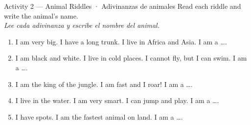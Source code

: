 \begin{activity}{Activity 2 — Animal Riddles · Adivinanzas de animales}
Read each riddle and write the animal's name. \\
\textit{Lee cada adivinanza y escribe el nombre del animal.}

\bigskip
\begin{enumerate}
  \item I am very big. I have a long trunk. I live in Africa and Asia.
        I am a \ldots \answerline[5cm].

  \item I am black and white. I live in cold places. I cannot fly,
        but I can swim. I am a \ldots \answerline[5cm].

  \item I am the king of the jungle. I am fast and I roar!
        I am a \ldots \answerline[5cm].

  \item I live in the water. I am very smart. I can jump and play.
        I am a \ldots \answerline[5cm].

  \item I have spots. I am the fastest animal on land.
        I am a \ldots \answerline[5cm].
\end{enumerate}
\end{activity}
